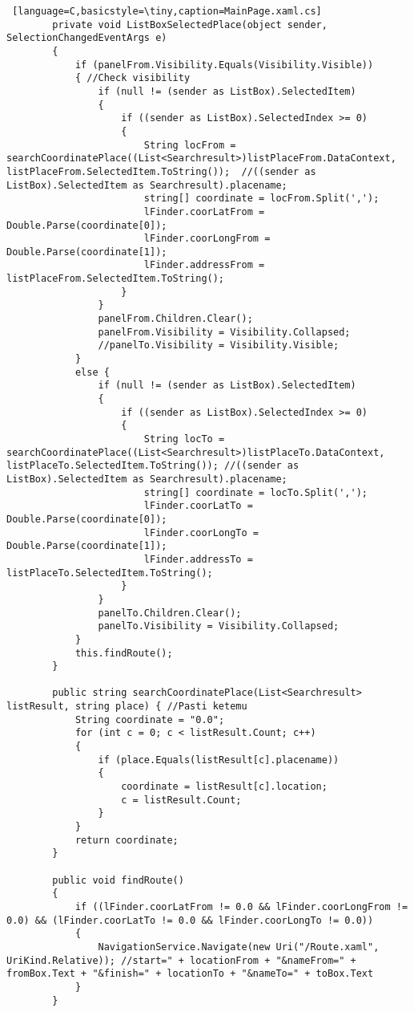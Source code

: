 \begin{lstlisting} [language=C,basicstyle=\tiny,caption=MainPage.xaml.cs]
        private void ListBoxSelectedPlace(object sender, SelectionChangedEventArgs e)
        {
            if (panelFrom.Visibility.Equals(Visibility.Visible))
            { //Check visibility
                if (null != (sender as ListBox).SelectedItem)
                {
                    if ((sender as ListBox).SelectedIndex >= 0)
                    {
                        String locFrom = searchCoordinatePlace((List<Searchresult>)listPlaceFrom.DataContext, listPlaceFrom.SelectedItem.ToString());  //((sender as ListBox).SelectedItem as Searchresult).placename;
                        string[] coordinate = locFrom.Split(',');
                        lFinder.coorLatFrom = Double.Parse(coordinate[0]);
                        lFinder.coorLongFrom = Double.Parse(coordinate[1]);
                        lFinder.addressFrom = listPlaceFrom.SelectedItem.ToString();
                    }
                }
                panelFrom.Children.Clear();
                panelFrom.Visibility = Visibility.Collapsed;
                //panelTo.Visibility = Visibility.Visible;
            }
            else {
                if (null != (sender as ListBox).SelectedItem)
                {
                    if ((sender as ListBox).SelectedIndex >= 0)
                    {
                        String locTo = searchCoordinatePlace((List<Searchresult>)listPlaceTo.DataContext, listPlaceTo.SelectedItem.ToString()); //((sender as ListBox).SelectedItem as Searchresult).placename;
                        string[] coordinate = locTo.Split(',');
                        lFinder.coorLatTo = Double.Parse(coordinate[0]);
                        lFinder.coorLongTo = Double.Parse(coordinate[1]);
                        lFinder.addressTo = listPlaceTo.SelectedItem.ToString();
                    }
                }
                panelTo.Children.Clear();
                panelTo.Visibility = Visibility.Collapsed;
            }
            this.findRoute();
        }

        public string searchCoordinatePlace(List<Searchresult> listResult, string place) { //Pasti ketemu
            String coordinate = "0.0";
            for (int c = 0; c < listResult.Count; c++)
            {
                if (place.Equals(listResult[c].placename))
                {
                    coordinate = listResult[c].location;
                    c = listResult.Count;
                }
            }
            return coordinate;
        }

        public void findRoute()
        {
            if ((lFinder.coorLatFrom != 0.0 && lFinder.coorLongFrom != 0.0) && (lFinder.coorLatTo != 0.0 && lFinder.coorLongTo != 0.0))
            {
                NavigationService.Navigate(new Uri("/Route.xaml", UriKind.Relative)); //start=" + locationFrom + "&nameFrom=" + fromBox.Text + "&finish=" + locationTo + "&nameTo=" + toBox.Text
            }
        }


\end{lstlisting}
